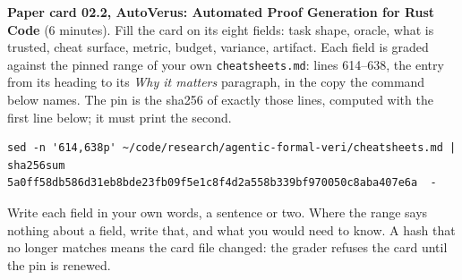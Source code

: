 \documentclass[11pt]{article}
\begin{document}
\begin{problem}\label{prob:B3}
\textbf{Paper card 02.2, AutoVerus: Automated Proof Generation for Rust Code}
(6 minutes). Fill the card on its eight fields: task shape, oracle, what is
trusted, cheat surface, metric, budget, variance, artifact. Each field is
graded against the pinned range of your own \texttt{cheatsheets.md}: lines
614--638, the entry from its heading to its \emph{Why it matters} paragraph,
in the copy the command below names. The pin is the sha256 of exactly those
lines, computed with the first line below; it must print the second.
{\small
\begin{verbatim}
sed -n '614,638p' ~/code/research/agentic-formal-veri/cheatsheets.md | sha256sum
5a0ff58db586d31eb8bde23fb09f5e1c8f4d2a558b339bf970050c8aba407e6a  -
\end{verbatim}
}
Write each field in your own words, a sentence or two. Where the range says
nothing about a field, write that, and what you would need to know. A hash
that no longer matches means the card file changed: the grader refuses the
card until the pin is renewed.
\end{problem}
\end{document}

